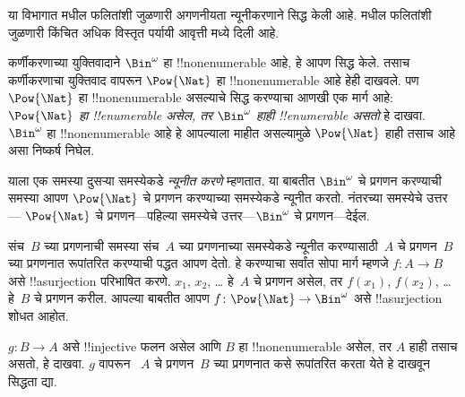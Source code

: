 \documentclass[../../../include/open-logic-section]{subfiles}
\begin{document}


\begin{editorial}
  या विभागात  मधील फलितांशी जुळणारी अगणनीयता
  न्यूनीकरणाने सिद्ध केली आहे.  मधील फलितांशी जुळणारी
  किंचित अधिक विस्तृत पर्यायी आवृत्ती  मध्ये दिली आहे.
\end{editorial}

कर्णीकरणाच्या युक्तिवादाने $\Bin^\omega$ हा !!{nonenumerable} आहे,
हे आपण सिद्ध केले. तसाच कर्णीकरणाचा युक्तिवाद वापरून $\Pow{\Nat}$ हा
!!{nonenumerable} आहे हेही दाखवले. पण $\Pow{\Nat}$ हा
!!{nonenumerable} असल्याचे सिद्ध करण्याचा आणखी एक मार्ग आहे:
\emph{$\Pow{\Nat}$ हा !!{enumerable} असेल, तर $\Bin^\omega$ हाही
!!{enumerable} असतो} हे दाखवा. $\Bin^\omega$ हा !!{nonenumerable}
आहे हे आपल्याला माहीत असल्यामुळे $\Pow{\Nat}$ हाही तसाच आहे असा
निष्कर्ष निघेल.

याला एक समस्या दुसऱ्या समस्येकडे \emph{न्यूनीत करणे} म्हणतात. या
बाबतीत $\Bin^\omega$ चे प्रगणन करण्याची समस्या आपण $\Pow{\Nat}$ चे
प्रगणन करण्याच्या समस्येकडे न्यूनीत करतो. नंतरच्या समस्येचे उत्तर---
$\Pow{\Nat}$ चे प्रगणन---पहिल्या समस्येचे उत्तर---$\Bin^\omega$ चे
प्रगणन---देईल.

संच~$B$ च्या प्रगणनाची समस्या संच~$A$ च्या प्रगणनाच्या समस्येकडे
न्यूनीत करण्यासाठी~$A$ चे प्रगणन~$B$ च्या प्रगणनात रूपांतरित करण्याची
पद्धत आपण देतो. हे करण्याचा सर्वांत सोपा मार्ग म्हणजे
$f\colon A \to B$ असे !!a{surjection} परिभाषित करणे. $x_1$, $x_2$,
\dots{} हे~$A$ चे प्रगणन असेल, तर $f(x_1)$, $f(x_2)$, \dots{} हे~$B$
चे प्रगणन करील. आपल्या बाबतीत आपण
$f\colon \Pow{\Nat} \to \Bin^\omega$ असे !!a{surjection} शोधत आहोत.

\begin{prob}
$g\colon B \to A$ असे !!{injective} फलन असेल आणि $B$ हा
!!{nonenumerable} असेल, तर $A$ हाही तसाच असतो, हे दाखवा. $g$ वापरून
~$A$ चे प्रगणन~$B$ च्या प्रगणनात कसे रूपांतरित करता येते हे दाखवून
सिद्धता द्या.
\end{prob}
\end{document}
